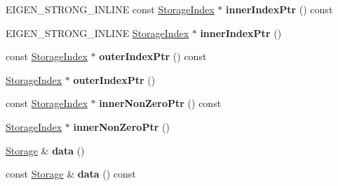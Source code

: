 \begin{DoxyCompactItemize}
E\+I\+G\+E\+N\+\_\+\+S\+T\+R\+O\+N\+G\+\_\+\+I\+N\+L\+I\+NE const \mbox{\hyperlink{class_eigen_1_1_sparse_matrix_base_a0b540ba724726ebe953f8c0df06081ed}{Storage\+Index}} $\ast$ {\bfseries inner\+Index\+Ptr} () const
\item 
\mbox{\label{class_eigen_1_1_sparse_vector_a2ac36aaf3db272cd505b2e65bfd94915}} 
E\+I\+G\+E\+N\+\_\+\+S\+T\+R\+O\+N\+G\+\_\+\+I\+N\+L\+I\+NE \mbox{\hyperlink{class_eigen_1_1_sparse_matrix_base_a0b540ba724726ebe953f8c0df06081ed}{Storage\+Index}} $\ast$ {\bfseries inner\+Index\+Ptr} ()
\item 
\mbox{\label{class_eigen_1_1_sparse_vector_a7c9cf5a25defcfac53312a2f6c54673d}} 
const \mbox{\hyperlink{class_eigen_1_1_sparse_matrix_base_a0b540ba724726ebe953f8c0df06081ed}{Storage\+Index}} $\ast$ {\bfseries outer\+Index\+Ptr} () const
\item 
\mbox{\label{class_eigen_1_1_sparse_vector_aa3111d79cca485429590350e5df0234e}} 
\mbox{\hyperlink{class_eigen_1_1_sparse_matrix_base_a0b540ba724726ebe953f8c0df06081ed}{Storage\+Index}} $\ast$ {\bfseries outer\+Index\+Ptr} ()
\item 
\mbox{\label{class_eigen_1_1_sparse_vector_a7ac06f6223596f527825460b74fac4bb}} 
const \mbox{\hyperlink{class_eigen_1_1_sparse_matrix_base_a0b540ba724726ebe953f8c0df06081ed}{Storage\+Index}} $\ast$ {\bfseries inner\+Non\+Zero\+Ptr} () const
\item 
\mbox{\label{class_eigen_1_1_sparse_vector_a3d12e66ff10c9ad2762b29cf511b2fa5}} 
\mbox{\hyperlink{class_eigen_1_1_sparse_matrix_base_a0b540ba724726ebe953f8c0df06081ed}{Storage\+Index}} $\ast$ {\bfseries inner\+Non\+Zero\+Ptr} ()
\item 
\mbox{\label{class_eigen_1_1_sparse_vector_afc6e85575deee06fd305b1c3c5917cc4}} 
\mbox{\hyperlink{class_eigen_1_1internal_1_1_compressed_storage}{Storage}} \& {\bfseries data} ()
\item 
\mbox{\label{class_eigen_1_1_sparse_vector_a30ab2cd7f19ee84cbee57728f49c5045}} 
const \mbox{\hyperlink{class_eigen_1_1internal_1_1_compressed_storage}{Storage}} \& {\bfseries data} () const

\end{DoxyCompactItemize}
